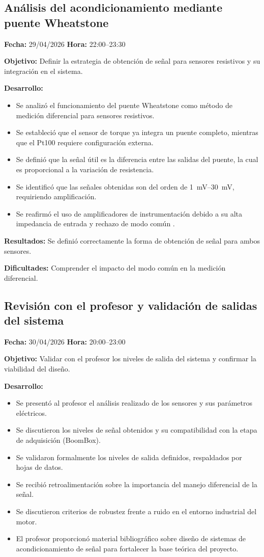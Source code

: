 \documentclass[12pt]{article}
\begin{document}
\subsection{Análisis del acondicionamiento mediante puente Wheatstone}
\textbf{Fecha:} 29/04/2026 \quad \textbf{Hora:} 22:00--23:30

\textbf{Objetivo:}
Definir la estrategia de obtención de señal para sensores resistivos y su integración en el sistema.

\textbf{Desarrollo:}
\begin{itemize}
\item Se analizó el funcionamiento del puente Wheatstone como método de medición diferencial para sensores resistivos.
\item Se estableció que el sensor de torque ya integra un puente completo, mientras que el Pt100 requiere configuración externa.
\item Se definió que la señal útil es la diferencia entre las salidas del puente, la cual es proporcional a la variación de resistencia.
\item Se identificó que las señales obtenidas son del orden de \SIrange{1}{30}{mV}, requiriendo amplificación.
\item Se reafirmó el uso de amplificadores de instrumentación debido a su alta impedancia de entrada y rechazo de modo común .
\end{itemize}

\textbf{Resultados:}
Se definió correctamente la forma de obtención de señal para ambos sensores.

\textbf{Dificultades:}
Comprender el impacto del modo común en la medición diferencial.

\subsection{Revisión con el profesor y validación de salidas del sistema}
\textbf{Fecha:} 30/04/2026 \quad \textbf{Hora:} 20:00--23:00

\textbf{Objetivo:}
Validar con el profesor los niveles de salida del sistema y confirmar la viabilidad del diseño.

\textbf{Desarrollo:}
\begin{itemize}
\item Se presentó al profesor el análisis realizado de los sensores y sus parámetros eléctricos.
\item Se discutieron los niveles de señal obtenidos y su compatibilidad con la etapa de adquisición (BoomBox).
\item Se validaron formalmente los niveles de salida definidos, respaldados por hojas de datos.
\item Se recibió retroalimentación sobre la importancia del manejo diferencial de la señal.
\item Se discutieron criterios de robustez frente a ruido en el entorno industrial del motor.
\item El profesor proporcionó material bibliográfico sobre diseño de sistemas de acondicionamiento de señal para fortalecer la base teórica del proyecto.
\end{itemize}
\end{document}

